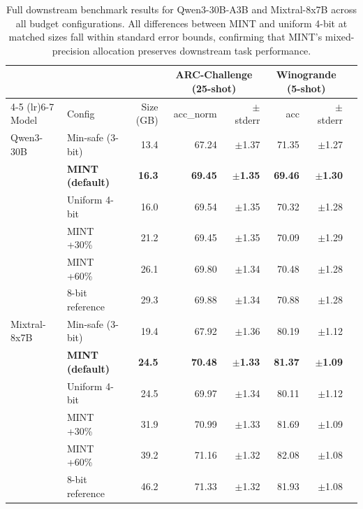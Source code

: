 \documentclass{article}
\begin{document}
\begin{table}[h]
\centering
\small
\caption{Full downstream benchmark results for Qwen3-30B-A3B and Mixtral-8x7B across all budget configurations. All differences between MINT and uniform 4-bit at matched sizes fall within standard error bounds, confirming that MINT's mixed-precision allocation preserves downstream task performance.}
\label{tab:downstream_full}
\begin{tabular}{llrrr@{\hskip 6pt}rr@{\hskip 6pt}r}
\toprule
& & & \multicolumn{2}{c}{ARC-Challenge (25-shot)} & \multicolumn{2}{c}{Winogrande (5-shot)} \\
\cmidrule(lr){4-5} \cmidrule(lr){6-7}
Model & Config & Size (GB) & acc\_norm & $\pm$ stderr & acc & $\pm$ stderr \\
\midrule
Qwen3-30B & Min-safe (3-bit) & 13.4 & 67.24 & $\pm$1.37 & 71.35 & $\pm$1.27 \\
 & \textbf{MINT (default)} & \textbf{16.3} & \textbf{69.45} & $\pm$\textbf{1.35} & \textbf{69.46} & $\pm$\textbf{1.30} \\
 & Uniform 4-bit & 16.0 & 69.54 & $\pm$1.35 & 70.32 & $\pm$1.28 \\
 & MINT +30\% & 21.2 & 69.45 & $\pm$1.35 & 70.09 & $\pm$1.29 \\
 & MINT +60\% & 26.1 & 69.80 & $\pm$1.34 & 70.48 & $\pm$1.28 \\
 & 8-bit reference & 29.3 & 69.88 & $\pm$1.34 & 70.88 & $\pm$1.28 \\
\midrule
Mixtral-8x7B & Min-safe (3-bit) & 19.4 & 67.92 & $\pm$1.36 & 80.19 & $\pm$1.12 \\
 & \textbf{MINT (default)} & \textbf{24.5} & \textbf{70.48} & $\pm$\textbf{1.33} & \textbf{81.37} & $\pm$\textbf{1.09} \\
 & Uniform 4-bit & 24.5 & 69.97 & $\pm$1.34 & 80.11 & $\pm$1.12 \\
 & MINT +30\% & 31.9 & 70.99 & $\pm$1.33 & 81.69 & $\pm$1.09 \\
 & MINT +60\% & 39.2 & 71.16 & $\pm$1.32 & 82.08 & $\pm$1.08 \\
 & 8-bit reference & 46.2 & 71.33 & $\pm$1.32 & 81.93 & $\pm$1.08 \\
\bottomrule
\end{tabular}
\end{table}
\end{document}
